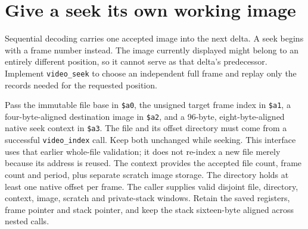 \section{Give a seek its own working image}
Sequential decoding carries one accepted image into the next delta. A seek begins
with a frame number instead. The image currently displayed might belong to an
entirely different position, so it cannot serve as that delta's predecessor.
Implement \texttt{video\_seek} to choose an independent full frame and replay
only the records needed for the requested position.

Pass the immutable file base in \texttt{\$a0}, the unsigned target frame index in
\texttt{\$a1}, a four-byte-aligned destination image in \texttt{\$a2}, and a
96-byte, eight-byte-aligned native seek context in \texttt{\$a3}. The file and
its offset directory must come from a successful \texttt{video\_index} call.
Keep both unchanged while seeking. This interface uses that earlier whole-file
validation; it does not re-index a new file merely because its address is reused.
The context provides the accepted file count, frame count and period, plus separate
scratch image storage. The directory holds at least one native offset per frame.
The caller supplies valid disjoint file, directory, context, image, scratch and
private-stack windows. Retain the saved registers, frame pointer and stack pointer,
and keep the stack sixteen-byte aligned across nested calls.

